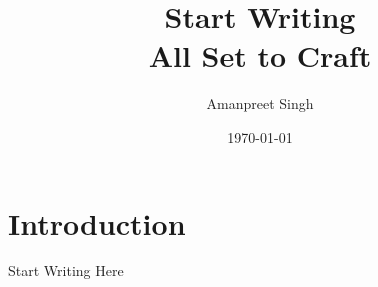 \documentclass{article}[a4paper,12pt]
\title{\huge Start Writing \\ \normalsize All Set to Craft}
\author{Amanpreet Singh}
\date{\today}
\begin{document}
  \maketitle %
  \newpage %
  \tableofcontents

\section{Introduction}
Start Writing Here

\end{document}
